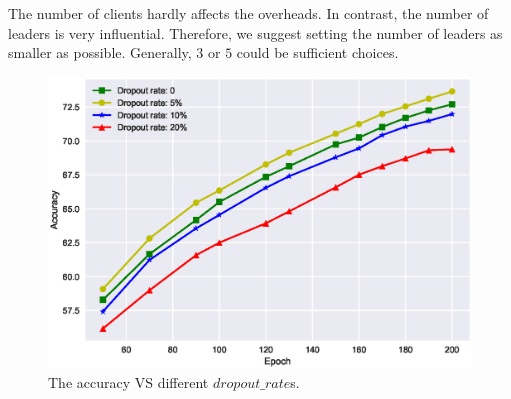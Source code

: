 The number of clients hardly affects the overheads. In contrast, the number of leaders is very influential. Therefore, we suggest setting the number of leaders as smaller as possible. Generally, $3$ or $5$ could be sufficient choices.

\begin{figure}[!ht]
    \centering
    \includegraphics[width=\columnwidth]{img/dropout-acc.eps}
    \caption{The accuracy VS different $dropout\_rate$s.}
    \label{dropout-acc}
\end{figure}

